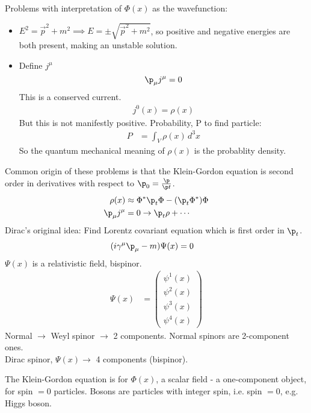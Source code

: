 \documentclass[a4paper, 11pt, normalem]{report}
\begin{document}
Problems with interpretation of $\Phi(x)$ as the wavefunction:
\begin{itemize}
    \item $E^2 = \vec{p}^2 + m^2 \implies E = \pm \sqrt{\vec{p}^2+m^2}$, so positive and negative energies are both present, making an unstable solution. 
    \item Define $j^\mu$
        \begin{equation}
            \p_\mu j^\mu = 0
        \end{equation}
        This is a conserved current.
        \begin{align}
            j^0(x) = \rho(x)
        \end{align}
        But this is not manifestly positive.
        Probability, P to find particle:
        \begin{align}
            P &= \int_V \rho(x)\,d^3x
        \end{align}
        So the quantum mechanical meaning of $\rho(x)$ is the probablity density.
\end{itemize}
Common origin of these problems is that the Klein-Gordon equation is second order in derivatives with respect to $\p_0 = \frac{\p}{\p t}$.
\begin{align}
    \rho(x) &\approx \Phi^*\p_t \Phi - (\p_t\Phi^*)\Phi \\
    \p_\mu j^\mu &= 0 \to \p_t\rho + \cdots
\end{align}
Dirac's original idea: Find Lorentz covariant equation which is first order in $\p_t$.
\begin{align}
    (i\gamma^\mu\p_\mu - m)\Psi(x) &= 0
\end{align}
$\Psi(x)$ is a relativistic field, bispinor.
\begin{align}
    \Psi(x) &= \begin{pmatrix} \psi^1(x) \\ \psi^2(x) \\ \psi^3(x) \\ \psi^4(x) \end{pmatrix}
\end{align}
Normal $\to$ Weyl spinor $\to$ 2 components. Normal spinors are 2-component ones. \\
Dirac spinor, $\Psi(x) \to$ 4 components (bispinor).

The Klein-Gordon equation is for $\Phi(x)$, a scalar field - a one-component object, for spin $=0$ particles. 
Bosons are particles with integer spin, i.e. spin $=0$, e.g. Higgs boson.
\end{document}
